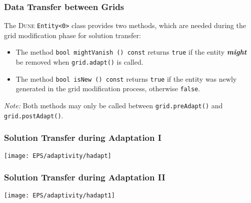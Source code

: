 \begin{frame}
  \frametitle{Data Transfer between Grids}

  The {\scshape Dune} \lstinline{Entity<0>} class provides two methods, which are
  needed during the grid modification phase for solution transfer:
  \begin{itemize}
    \item The method\newline
      \lstinline{bool mightVanish () const}\newline
      returns \lstinline{true} if the entity {\bfseries \emph{might}} be removed when
      \lstinline{grid.adapt()} is called.

      \pause

    \item The method\newline
      \lstinline{bool isNew () const}\newline
      returns \lstinline{true} if the entity was newly generated in the
      grid modification process, otherwise \lstinline{false}.
  \end{itemize}

  \pause

  \begin{block}{\emph{Note:}}
    Both methods may only be called between \lstinline{grid.preAdapt()}
    and \lstinline{grid.postAdapt()}.
  \end{block}

\end{frame}

\begin{frame}
  \frametitle{Solution Transfer during Adaptation I}

  \begin{center}
    \texttt{[image: EPS/adaptivity/hadapt]}
  \end{center}

\end{frame}

\begin{frame}
  \frametitle{Solution Transfer during Adaptation II}

  \begin{center}
    \texttt{[image: EPS/adaptivity/hadapt1]}
  \end{center}

\end{frame}

